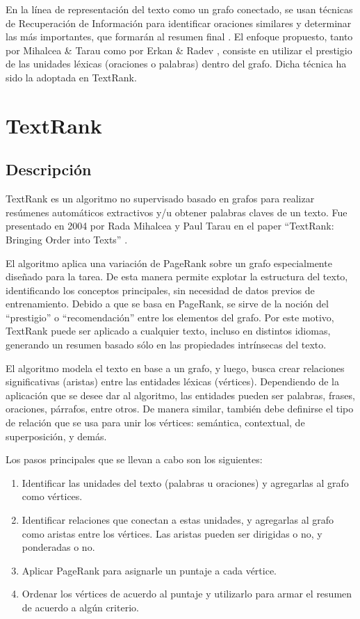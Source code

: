 \documentclass{llncs}
\begin{document}
En la línea de representación del texto como un grafo conectado, se usan técnicas de Recuperación de Información para identificar oraciones similares y determinar las más importantes, que formarán al resumen final \cite{salton}. El enfoque propuesto, tanto por Mihalcea \& Tarau como por Erkan \& Radev \cite{erkan}, consiste en utilizar el prestigio de las unidades léxicas (oraciones o palabras) dentro del grafo. Dicha técnica ha sido la adoptada en TextRank.


\section{TextRank}

\subsection{Descripción}
TextRank es un algoritmo no supervisado basado en grafos para realizar resúmenes automáticos extractivos y/u obtener palabras claves de un texto. Fue presentado en 2004 por Rada Mihalcea y Paul Tarau en el paper “TextRank: Bringing Order into Texts” \cite{mihalcea-tarau}.

El algoritmo aplica una variación de PageRank \cite{pageetal98} sobre un grafo especialmente diseñado para la tarea. De esta manera permite explotar la estructura del texto, identificando los conceptos principales, sin necesidad de datos previos de entrenamiento. Debido a que se basa en PageRank, se sirve de la noción del “prestigio” o “recomendación” entre los elementos del grafo. Por este motivo, TextRank puede ser aplicado a cualquier texto, incluso en distintos idiomas, generando un resumen basado sólo en las propiedades intrínsecas del texto.

El algoritmo modela el texto en base a un grafo, y luego, busca crear relaciones significativas (aristas) entre las entidades léxicas (vértices). Dependiendo de la aplicación que se desee dar al algoritmo, las entidades pueden ser palabras, frases, oraciones, párrafos, entre otros. De manera similar, también debe definirse el tipo de relación que se usa para unir los vértices: semántica, contextual, de superposición, y demás.

Los pasos principales que se llevan a cabo son los siguientes:

\begin{enumerate}
\item Identificar las unidades del texto (palabras u oraciones) y agregarlas al grafo como vértices.
\item Identificar relaciones que conectan a estas unidades, y agregarlas al grafo como aristas entre los vértices. Las aristas pueden ser dirigidas o no, y ponderadas o no.
\item Aplicar PageRank para asignarle un puntaje a cada vértice.
\item Ordenar los vértices de acuerdo al puntaje y utilizarlo para armar el resumen de acuerdo a algún criterio.
\end{enumerate}
\end{document}
